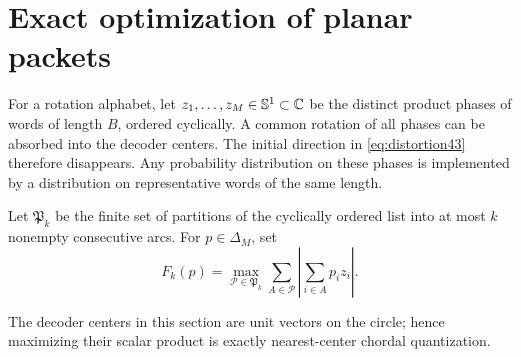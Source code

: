 \section{Exact optimization of planar packets}\label{sec:circle}
For a rotation alphabet, let $z_1,\ldots,z_M\in\mathbb S^1\subset\mathbb C$ be the distinct product phases of words of length $B$, ordered cyclically. A common rotation of all phases can be absorbed into the decoder centers. The initial direction in \eqref{eq:distortion43} therefore disappears. Any probability distribution on these phases is implemented by a distribution on representative words of the same length.

Let $\mathfrak P_k$ be the finite set of partitions of the cyclically ordered list into at most $k$ nonempty consecutive arcs. For $p\in\Delta_M$, set
\begin{equation}\label{eq:partition-value}
 F_k(p)=\max_{\mathcal P\in\mathfrak P_k}
                \sum_{A\in\mathcal P}\left|\sum_{i\in A}p_i z_i\right|.
\end{equation}

The decoder centers in this section are unit vectors on the circle; hence maximizing their scalar product is exactly nearest-center chordal quantization.

